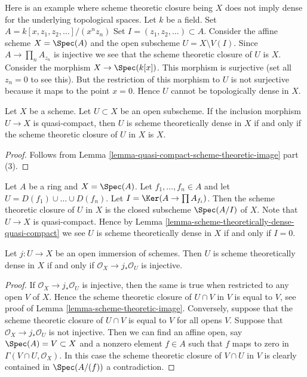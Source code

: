 \begin{example}
\label{example-scheme-theretically-dense-not-dense}
Here is an example where scheme theoretic closure being $X$ does not
imply dense for the underlying topological spaces.
Let $k$ be a field.
Set $A = k[x, z_1, z_2, \ldots]/(x^n z_n)$
Set $I = (z_1, z_2, \ldots) \subset A$.
Consider the affine scheme $X = \Spec(A)$ and the
open subscheme $U = X \setminus V(I)$.
Since $A \to \prod_n A_{z_n}$ is injective we see that the scheme theoretic
closure of $U$ is $X$. Consider the morphism
$X \to \Spec(k[x])$. This morphism is surjective
(set all $z_n = 0$ to see this). But the restriction
of this morphism to $U$ is not surjective because it maps
to the point $x = 0$. Hence $U$ cannot be topologically dense
in $X$.
\end{example}

\begin{lemma}
\label{lemma-scheme-theoretically-dense-quasi-compact}
Let $X$ be a scheme.
Let $U \subset X$ be an open subscheme.
If the inclusion morphism $U \to X$ is quasi-compact, then $U$
is scheme theoretically dense in $X$ if and only if the scheme theoretic
closure of $U$ in $X$ is $X$.
\end{lemma}

\begin{proof}
Follows from Lemma \ref{lemma-quasi-compact-scheme-theoretic-image} part (3).
\end{proof}

\begin{example}
\label{example-scheme-theoretic-closure}
Let $A$ be a ring and $X = \Spec(A)$.
Let $f_1, \ldots, f_n \in A$ and let $U = D(f_1) \cup \ldots \cup D(f_n)$.
Let $I = \Ker(A \to \prod A_{f_i})$.
Then the scheme theoretic closure of $U$ in $X$
is the closed subscheme $\Spec(A/I)$ of $X$.
Note that $U \to X$ is quasi-compact. Hence by
Lemma \ref{lemma-scheme-theoretically-dense-quasi-compact}
we see $U$ is scheme theoretically dense in $X$ if and only if $I = 0$.
\end{example}

\begin{lemma}
\label{lemma-characterize-scheme-theoretically-dense}
Let $j : U \to X$ be an open immersion of schemes.
Then $U$ is scheme theoretically dense in $X$ if and only if
$\mathcal{O}_X \to j_*\mathcal{O}_U$ is injective.
\end{lemma}

\begin{proof}
If $\mathcal{O}_X \to j_*\mathcal{O}_U$ is injective,
then the same is true when restricted to any open $V$ of $X$.
Hence the scheme theoretic closure of $U \cap V$ in $V$
is equal to $V$, see proof of Lemma \ref{lemma-scheme-theoretic-image}.
Conversely, suppose that the scheme theoretic
closure of $U \cap V$ is equal to $V$ for all opens $V$.
Suppose that $\mathcal{O}_X \to j_*\mathcal{O}_U$ is not injective.
Then we can find an affine open, say $\Spec(A) = V \subset X$
and a nonzero element $f \in A$ such that $f$ maps to zero in
$\Gamma(V \cap U, \mathcal{O}_X)$. In this case the scheme theoretic
closure of $V \cap U$ in $V$ is clearly contained in $\Spec(A/(f))$
a contradiction.
\end{proof}

